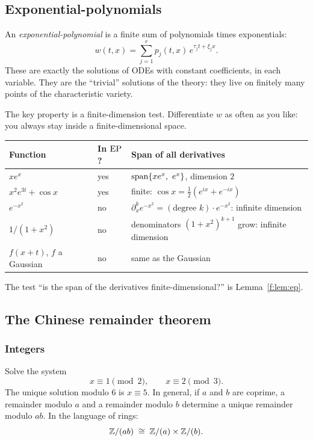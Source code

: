 \subsection{Exponential-polynomials}\label{sec:pr-ep}

An \emph{exponential-polynomial} is a finite sum of polynomials times exponentials:
\[
w(t,x)=\sum_{j=1}^{r}p_j(t,x)\,e^{\tau_jt+\xi_jx}.
\]
These are exactly the solutions of ODEs with constant coefficients, in each variable. They are the ``trivial'' solutions of the theory: they live on finitely many points of the characteristic variety.

The key property is a finite-dimension test. Differentiate $w$ as often as you like: you always stay inside a finite-dimensional space.

\begin{example}
\begin{center}\small
\begin{tabular}{@{}L{4.4cm}L{1.6cm}L{8.0cm}@{}}
\toprule
Function & In $\mathrm{EP}$? & Span of all derivatives\\\midrule
$xe^{x}$ & yes & $\operatorname{span}\{xe^x,\ e^x\}$, dimension $2$\\
$x^2e^{3t}+\cos x$ & yes & finite: $\cos x=\tfrac12(e^{ix}+e^{-ix})$\\
$e^{-x^2}$ & no & $\partial_x^ke^{-x^2}=(\text{degree }k)\cdot e^{-x^2}$: infinite dimension\\
$1/(1+x^2)$ & no & denominators $(1+x^2)^{k+1}$ grow: infinite dimension\\
$f(x+t)$, $f$ a Gaussian & no & same as the Gaussian\\
\bottomrule
\end{tabular}
\end{center}
The test ``is the span of the derivatives finite-dimensional?'' is Lemma~\ref{f:lem:ep}.
\end{example}

\subsection{The Chinese remainder theorem}\label{sec:pr-crt}

\subsubsection{Integers}

Solve the system
\[
x\equiv1\pmod 2,\qquad x\equiv2\pmod 3 .
\]
The unique solution modulo $6$ is $x\equiv5$. In general, if $a$ and $b$ are coprime, a remainder modulo $a$ and a remainder modulo $b$ determine a unique remainder modulo $ab$. In the language of rings:
\[
\mathbb{Z}/(ab)\;\cong\;\mathbb{Z}/(a)\times\mathbb{Z}/(b).
\]

